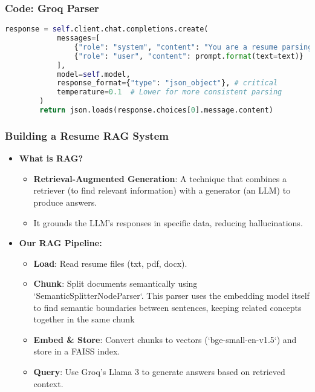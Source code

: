 \begin{frame}[fragile]\frametitle{Code: Groq Parser}
    \begin{lstlisting}[language=Python, basicstyle=\tiny, caption={llm\_parsing\_groq.py}]
        response = self.client.chat.completions.create(
            messages=[
                {"role": "system", "content": "You are a resume parsing expert. Output only valid JSON."},
                {"role": "user", "content": prompt.format(text=text)}
            ],
            model=self.model,
            response_format={"type": "json_object"}, # critical
            temperature=0.1  # Lower for more consistent parsing
        )
        return json.loads(response.choices[0].message.content)
    \end{lstlisting}
\end{frame}


\begin{frame}[fragile]\frametitle{Building a Resume RAG System}
    \begin{itemize}
        \item \textbf{What is RAG?}
        \begin{itemize}
            \item \textbf{Retrieval-Augmented Generation}: A technique that combines a retriever (to find relevant information) with a generator (an LLM) to produce answers.
            \item It grounds the LLM's responses in specific data, reducing hallucinations.
        \end{itemize}
        \item \textbf{Our RAG Pipeline:}
        \begin{itemize}
            \item \textbf{Load}: Read resume files (txt, pdf, docx).
            \item \textbf{Chunk}: Split documents semantically using `SemanticSplitterNodeParser`. This parser uses the embedding model itself to find semantic boundaries between sentences, keeping related concepts together in the same chunk
            \item \textbf{Embed \& Store}: Convert chunks to vectors (`bge-small-en-v1.5`) and store in a FAISS index.
            \item \textbf{Query}: Use Groq's Llama 3 to generate answers based on retrieved context.
        \end{itemize}
    \end{itemize}
\end{frame}

